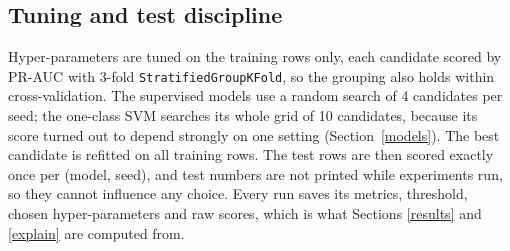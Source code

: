\subsection{Tuning and test discipline}

Hyper-parameters are tuned on the training rows only, each candidate scored by PR-AUC with 3-fold
\texttt{StratifiedGroupKFold}, so the grouping also holds within cross-validation. The supervised
models use a random search of 4 candidates per seed; the one-class SVM searches its whole grid of
10 candidates, because its score turned out to depend strongly on one setting
(Section~\ref{models}). The best candidate is refitted
on all training rows. The test rows are then scored exactly once per (model, seed), and test
numbers are not printed while experiments run, so they cannot influence any choice. Every run
saves its metrics, threshold, chosen hyper-parameters and raw scores, which is what Sections
\ref{results} and \ref{explain} are computed from.

